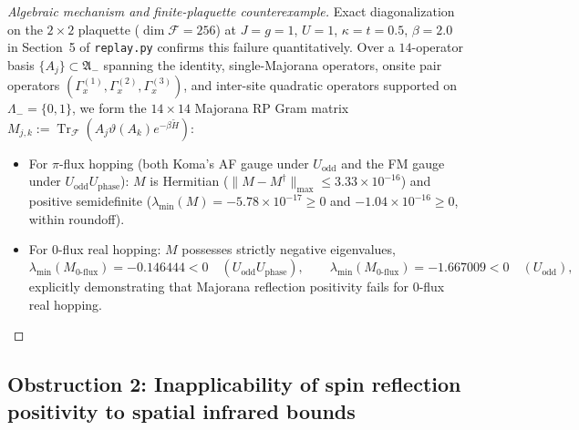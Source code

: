 \documentclass[11pt]{article}
\theoremstyle{definition}
\theoremstyle{remark}
\DeclareMathOperator{\Tr}{Tr}
\newcommand{\calF}{\mathcal{F}}
\begin{document}
\begin{proof}[Algebraic mechanism and finite-plaquette counterexample]
Exact diagonalization on the $2 \times 2$ plaquette ($\dim \calF = 256$) at $J = g = 1$, $U = 1$, $\kappa = t = 0.5$, $\beta = 2.0$ in Section~5 of \texttt{replay.py} confirms this failure quantitatively. Over a $14$-operator basis $\{A_j\} \subset \mathfrak{A}_-$ spanning the identity, single-Majorana operators, onsite pair operators $(\Gamma_x^{(1)}, \Gamma_x^{(2)}, \Gamma_x^{(3)})$, and inter-site quadratic operators supported on $\Lambda_- = \{0, 1\}$, we form the $14 \times 14$ Majorana RP Gram matrix $M_{j,k} := \Tr_{\calF}(A_j \vartheta(A_k) e^{-\beta \tilde{H}})$:
\begin{itemize}[leftmargin=2em]
\item For $\pi$-flux hopping (both Koma's AF gauge under $U_{\mathrm{odd}}$ and the FM gauge under $U_{\mathrm{odd}}U_{\mathrm{phase}}$): $M$ is Hermitian ($\|M - M^\dagger\|_{\max} \le 3.33 \times 10^{-16}$) and positive semidefinite ($\lambda_{\min}(M) = -5.78 \times 10^{-17} \ge 0$ and $-1.04 \times 10^{-16} \ge 0$, within roundoff).
\item For $0$-flux real hopping: $M$ possesses strictly negative eigenvalues,
\begin{equation}\label{eq:obs-rp-eigs}
\lambda_{\min}(M_{0\text{-flux}}) = -0.146444 < 0 \quad (U_{\mathrm{odd}}U_{\mathrm{phase}}), \qquad \lambda_{\min}(M_{0\text{-flux}}) = -1.667009 < 0 \quad (U_{\mathrm{odd}}),
\end{equation}
explicitly demonstrating that Majorana reflection positivity fails for $0$-flux real hopping.
\end{itemize}
\end{proof}

\subsection{Obstruction 2: Inapplicability of spin reflection positivity to spatial infrared bounds}\label{subsec:obs2}
\end{document}
